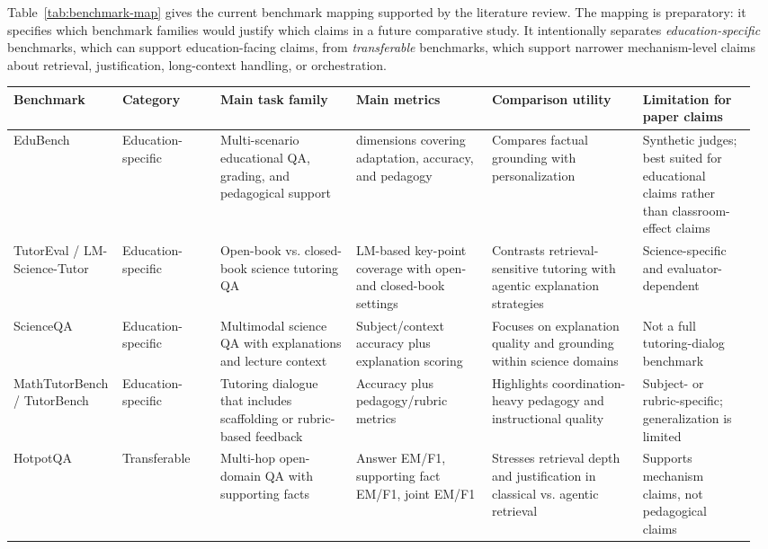 Table~\ref{tab:benchmark-map} gives the current benchmark mapping supported by the literature review. The mapping is preparatory: it specifies which benchmark families would justify which claims in a future comparative study. It intentionally separates \emph{education-specific} benchmarks, which can support education-facing claims, from \emph{transferable} benchmarks, which support narrower mechanism-level claims about retrieval, justification, long-context handling, or orchestration.

\begin{table}[t]
\centering
\scriptsize
\begingroup
\setlength{\tabcolsep}{3.5pt}
\renewcommand{\arraystretch}{1.2}
\begin{tabular}{@{}>{\raggedright\arraybackslash}p{0.12\linewidth}>{\raggedright\arraybackslash}p{0.13\linewidth}>{\raggedright\arraybackslash}p{0.18\linewidth}>{\raggedright\arraybackslash}p{0.18\linewidth}>{\raggedright\arraybackslash}p{0.2\linewidth}>{\raggedright\arraybackslash}p{0.15\linewidth}@{}}
\toprule
Benchmark & Category & Main task family & Main metrics & Comparison utility & \shortstack[c]{Limitation for\\paper claims} \\
\midrule
EduBench & Education-specific & Multi-scenario educational QA, grading, and pedagogical support & 12 dimensions covering adaptation, accuracy, and pedagogy & Compares factual grounding with personalization & Synthetic judges; best suited for educational claims rather than classroom-effect claims \\
TutorEval / LM-Science-Tutor & Education-specific & Open-book vs. closed-book science tutoring QA & LM-based key-point coverage with open- and closed-book settings & Contrasts retrieval-sensitive tutoring with agentic explanation strategies & Science-specific and evaluator-dependent \\
ScienceQA & Education-specific & Multimodal science QA with explanations and lecture context & Subject/context accuracy plus explanation scoring & Focuses on explanation quality and grounding within science domains & Not a full tutoring-dialog benchmark \\
MathTutorBench / TutorBench & Education-specific & Tutoring dialogue that includes scaffolding or rubric-based feedback & Accuracy plus pedagogy/rubric metrics & Highlights coordination-heavy pedagogy and instructional quality & Subject- or rubric-specific; generalization is limited \\
HotpotQA & Transferable & Multi-hop open-domain QA with supporting facts & Answer EM/F1, supporting fact EM/F1, joint EM/F1 & Stresses retrieval depth and justification in classical vs. agentic retrieval & Supports mechanism claims, not pedagogical claims \\

\end{tabular}
\end{table}

